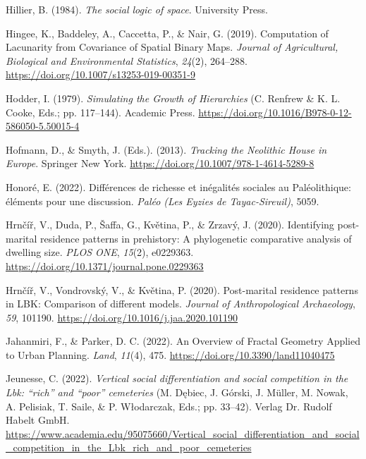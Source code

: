 \documentclass[
  12pt,
]{book}
\newlength{\cslhangindent}
\newlength{\cslentryspacingunit} %
\newenvironment{CSLReferences}[2] %
 {%
  \setlength{\parindent}{0pt}
  \ifodd #1
  \let\oldpar\par
  \def\par{\hangindent=\cslhangindent\oldpar}
  \fi
  \setlength{\parskip}{#2\cslentryspacingunit}
 }%
 {}
\begin{document}
\begin{CSLReferences}{1}{0}
\leavevmode{}%
Hillier, B. (1984). \emph{The social logic of space}. University Press.

\leavevmode{}%
Hingee, K., Baddeley, A., Caccetta, P., \& Nair, G. (2019). Computation of Lacunarity from Covariance of Spatial Binary Maps. \emph{Journal of Agricultural, Biological and Environmental Statistics}, \emph{24}(2), 264--288. \url{https://doi.org/10.1007/s13253-019-00351-9}

\leavevmode{}%
Hodder, I. (1979). \emph{Simulating the Growth of Hierarchies} (C. Renfrew \& K. L. Cooke, Eds.; pp. 117--144). Academic Press. \url{https://doi.org/10.1016/B978-0-12-586050-5.50015-4}

\leavevmode{}%
Hofmann, D., \& Smyth, J. (Eds.). (2013). \emph{Tracking the Neolithic House in Europe}. Springer New York. \url{https://doi.org/10.1007/978-1-4614-5289-8}

\leavevmode{}%
Honoré, E. (2022). Différences de richesse et inégalités sociales au Paléolithique: éléments pour une discussion. \emph{Paléo (Les Eyzies de Tayac-Sireuil)}, 5059.

\leavevmode{}%
Hrnčíř, V., Duda, P., Šaffa, G., Květina, P., \& Zrzavý, J. (2020). Identifying post-marital residence patterns in prehistory: A phylogenetic comparative analysis of dwelling size. \emph{PLOS ONE}, \emph{15}(2), e0229363. \url{https://doi.org/10.1371/journal.pone.0229363}

\leavevmode{}%
Hrnčíř, V., Vondrovský, V., \& Květina, P. (2020). Post-marital residence patterns in LBK: Comparison of different models. \emph{Journal of Anthropological Archaeology}, \emph{59}, 101190. \url{https://doi.org/10.1016/j.jaa.2020.101190}

\leavevmode{}%
Jahanmiri, F., \& Parker, D. C. (2022). An Overview of Fractal Geometry Applied to Urban Planning. \emph{Land}, \emph{11}(4), 475. \url{https://doi.org/10.3390/land11040475}

\leavevmode{}%
Jeunesse, C. (2022). \emph{Vertical social differentiation and social competition in the Lbk: {``}rich{''} and {``}poor{''} cemeteries} (M. Dębiec, J. Górski, J. Müller, M. Nowak, A. Pelisiak, T. Saile, \& P. Włodarczak, Eds.; pp. 33--42). Verlag Dr. Rudolf Habelt GmbH. \url{https://www.academia.edu/95075660/Vertical_social_differentiation_and_social_competition_in_the_Lbk_rich_and_poor_cemeteries}


\end{CSLReferences}
\end{document}
